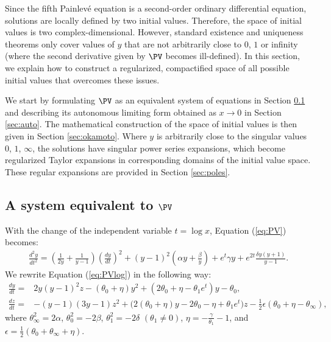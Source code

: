 Since the fifth Painlev\'e equation is a second-order ordinary differential equation, solutions are locally defined by two initial values. Therefore, the space of initial values is two complex-dimensional. However, standard existence and uniqueness theorems only cover values of $y$ that are not arbitrarily close to $0$, $1$ or infinity (where the second derivative given by $\PV$ becomes ill-defined). In this section, we explain how to construct a regularized, compactified space of all possible initial values that overcomes these issues.

We start by formulating $\PV$ as an equivalent system of equations in Section \ref{sec:system} and describing its autonomous limiting form obtained as $x\to0$ in Section \ref{sec:auto}. The mathematical construction of the space of initial values is then given in Section \ref{sec:okamoto}. Where $y$ is arbitrarily close to the singular values $0$, $1$, $\infty$, the solutions have singular power series expansions, which become regularized Taylor expansions in corresponding domains of the initial value space. These regular expansions are provided in Section \ref{sec:poles}.

\subsection{A system equivalent to $\PV$}\label{sec:system}

With the change of the independent variable $t=\log x$, Equation (\ref{eq:PV}) becomes:
\begin{equation}\label{eq:PVlog}
\begin{split}
\frac{d^2y}{dt^2}=%
\left(\frac{1}{2y}+\frac{1}{y-1}\right) \left(\frac{dy}{dt}\right)^2+(y-1)^2\left(\alpha y+\frac{\beta}{y}\right)
+e^t\gamma y +e^{2t}\frac{\delta y(y+1)}{y-1}.
\end{split}
\end{equation}
We rewrite Equation (\ref{eq:PVlog}) in the following way:
\begin{equation}\label{eq:PVlog-system}
\begin{split}
\frac{dy}{dt}=&
 2 y (y-1)^2z-(\theta_0+\eta)y^2+(2\theta_0+\eta-\theta_1 e^t)y-\theta_0,
\\
\frac{dz}{dt}=&-
(y-1)(3y-1)z^2+\big(2(\theta_0+\eta)y-2\theta_0-\eta+\theta_1 e^t\big)z
-\frac12\epsilon(\theta_0+\eta-\theta_{\infty}),
\end{split}
\end{equation}
where
$\theta_{\infty}^2=2\alpha$,
$\theta_0^2=-2\beta$,
$\theta_1^2=-2\delta$ $(\theta_1\neq0)$,
$\eta=-\frac{\gamma}{\theta_1}-1$, and
$\epsilon=\frac12(\theta_0+\theta_{\infty}+\eta)$.

